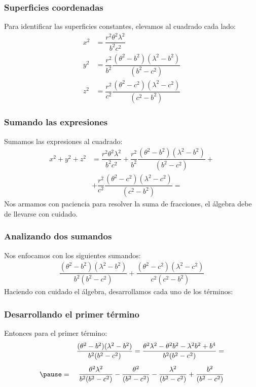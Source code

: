 \documentclass[12pt]{beamer}
\begin{document}
\begin{frame}
\frametitle{Superficies coordenadas}
Para identificar las superficies constantes, elevamos al cuadrado cada lado:
\pause
\begin{align*}
x^{2} &= \dfrac{r^{2} \theta^{2} \lambda^{2}}{b^{2} c^{2}} \\[0.5em]
y^{2} &= \dfrac{r^{2}}{b^{2}} \dfrac{(\theta^{2} - b^{2})(\lambda^{2} - b^{2})}{(b^{2} - c^{2})} \\[0.5em]
z^{2} &= \dfrac{r^{2}}{c^{2}} \dfrac{(\theta^{2} - c^{2})(\lambda^{2} - c^{2})}{(c^{2} - b^{2})}
\end{align*}
\end{frame}
\begin{frame}
\frametitle{Sumando las expresiones}
Sumamos las expresiones al cuadrado:
\begin{align*}
x^{2} + y^{2} + z^{2} &= \dfrac{r^{2} \theta^{2} \lambda^{2}}{b^{2} c^{2}} + \dfrac{r^{2}}{b^{2}} \dfrac{(\theta^{2} - b^{2})(\lambda^{2} - b^{2})}{(b^{2} - c^{2})} + \\[0.5em]
&+ \dfrac{r^{2}}{c^{2}} \dfrac{(\theta^{2} - c^{2})(\lambda^{2} - c^{2})}{(c^{2} - b^{2})} =
\end{align*}
\pause
Nos armamos con paciencia para resolver la suma de fracciones, el álgebra debe de llevarse con cuidado.
\end{frame}
\begin{frame}
\frametitle{Analizando dos sumandos}
Nos enfocamos con los siguientes sumandos:
\pause
\begin{align*}
\dfrac{(\theta^{2} - b^{2})(\lambda^{2} - b^{2})}{b^{2}(b^{2} - c^{2})} + \dfrac{(\theta^{2} - c^{2})(\lambda^{2} - c^{2})}{c^{2}(c^{2} - b^{2})}
\end{align*}
\pause
Haciendo con cuidado el álgebra, desarrollamos cada uno de los términos:
\end{frame}
\begin{frame}
\frametitle{Desarrollando el primer término}
Entonces para el primer término:
\pause
\begin{eqnarray*}
&{}&\dfrac{(\theta^{2} - b^{2})(\lambda^{2} - b^{2})}{b^{2}(b^{2} - c^{2})} = \dfrac{\theta^{2} \lambda^{2} - \theta^2 b^{2} - \lambda^{2} b^{2} + b^{4}}{b^{2}(b^{2} - c^{2})} = \\[0.5em] \pause
&=& \dfrac{\theta^{2} \lambda^{2}}{b^{2}(b^{2} - c^{2})} - \dfrac{\theta^{2}}{(b^{2} - c^{2})} - \dfrac{\lambda^{2}}{(b^{2} - c^{2})} + \dfrac{b^{2}}{(b^{2} - c^{2})}
\end{eqnarray*}
\end{frame}
\end{document}
